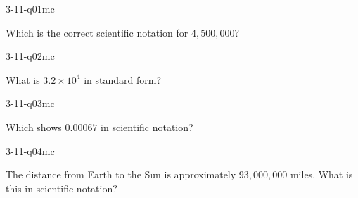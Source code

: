 

\begin{practiceQuestion}{3-11-q01}{mc}
\begin{questionText}
Which is the correct scientific notation for $4{,}500{,}000$?
\end{questionText}
\end{practiceQuestion}

\begin{practiceQuestion}{3-11-q02}{mc}
\begin{questionText}
What is $3.2 \times 10^4$ in standard form?
\end{questionText}
\end{practiceQuestion}

\begin{practiceQuestion}{3-11-q03}{mc}
\begin{questionText}
Which shows $0.00067$ in scientific notation?
\end{questionText}
\end{practiceQuestion}

\begin{practiceQuestion}{3-11-q04}{mc}
\begin{questionText}
The distance from Earth to the Sun is approximately $93{,}000{,}000$ miles. What is this in scientific notation?
\end{questionText}
\end{practiceQuestion}

